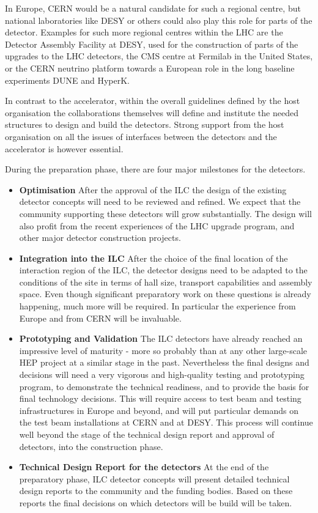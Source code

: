 \documentclass[%
 reprint,
 floatfix,
 amsmath,amssymb,
 aps,
]{revtex4-1}
\begin{document}
In Europe, CERN would be a natural candidate for such a regional 
centre, but national laboratories like DESY or others could also play this role 
for parts of the detector. Examples for such more regional centres within the 
LHC are the Detector Assembly Facility at DESY, used for the construction of 
parts of the upgrades to the LHC detectors, the CMS centre at Fermilab in the 
United States, or the CERN neutrino platform towards a European role in the long 
baseline experiments DUNE and HyperK. 

In contrast to the accelerator, within the overall guidelines defined by the host organisation the collaborations themselves will define and institute the needed structures to design and build the detectors. Strong support from the host 
organisation on all the issues of interfaces between the detectors and the accelerator is however essential. 

During the preparation phase, there are four major milestones for the
detectors.
\begin{itemize}

\item{\bfseries Optimisation} After the approval of the ILC the design of the 
existing detector concepts will need to be reviewed and refined. We expect that 
the community supporting these detectors will grow substantially. The design 
will also profit from the recent experiences of the LHC upgrade program, and 
other major detector construction projects. 

\item{\bfseries Integration into the ILC}
After the choice of the final location of the interaction region of the ILC, the 
detector designs need to be adapted to the
conditions of the site in terms of hall size, transport capabilities and
assembly space. Even though significant preparatory work on these questions is 
already happening, much more will be required. In particular the experience from 
Europe and from CERN will be invaluable. 

 
\item{\bfseries Prototyping and Validation}
The ILC detectors have already reached an impressive level of maturity - more so 
probably than at any other large-scale HEP project at a similar stage in the 
past. Nevertheless the final designs and decisions will need a very vigorous and 
high-quality testing and prototyping program, to demonstrate the technical 
readiness, and to provide the basis for final technology decisions. This will 
require access to test beam and testing infrastructures in Europe and beyond, 
and will put particular demands on the test beam installations at CERN and at 
DESY. This process will continue well beyond the stage of the technical design 
report and approval of detectors, into the construction phase.

\item{\bfseries Technical Design Report for the detectors}
At the end of the preparatory phase, ILC detector concepts will present 
detailed technical design reports to the community and the funding bodies. Based 
on these reports the final decisions on which detectors will be build will be 
taken. 
\end{itemize}
\end{document}
